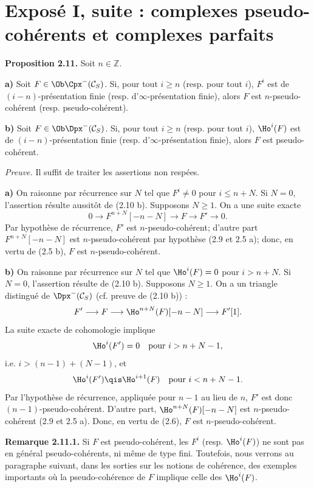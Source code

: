 \documentclass[11pt]{article}
\begin{document}
\section*{Exposé I, suite : complexes pseudo-cohérents et complexes parfaits}

\textbf{Proposition 2.11.} Soit \(n\in\mathbb Z\).

\textbf{a)} Soit \(F\in\Ob\Cpx^-(\mathcal C_S)\). Si, pour tout \(i\geq n\) (resp. pour tout \(i\)), \(F^i\) est de \((i-n)\)-présentation finie (resp. d'\(\infty\)-présentation finie), alors \(F\) est \(n\)-pseudo-cohérent (resp. pseudo-cohérent).

\textbf{b)} Soit \(F\in\Ob\Dpx^-(\mathcal C_S)\). Si, pour tout \(i\geq n\) (resp. pour tout \(i\)), \(\Ho^i(F)\) est de \((i-n)\)-présentation finie (resp. d'\(\infty\)-présentation finie), alors \(F\) est pseudo-cohérent.

\emph{Preuve.} Il suffit de traiter les assertions non respées.

\textbf{a)} On raisonne par récurrence sur \(N\) tel que \(F^i\neq0\) pour \(i\leq n+N\). Si \(N=0\), l'assertion résulte aussitôt de (2.10 b). Supposons \(N\geq1\). On a une suite exacte
\[
  0\longrightarrow F^{n+N}[-n-N]\longrightarrow F\longrightarrow F'\longrightarrow 0 .
\]
Par hypothèse de récurrence, \(F'\) est \(n\)-pseudo-cohérent; d'autre part \(F^{n+N}[-n-N]\) est \(n\)-pseudo-cohérent par hypothèse (2.9 et 2.5 a); donc, en vertu de (2.5 b), \(F\) est \(n\)-pseudo-cohérent.

\textbf{b)} On raisonne par récurrence sur \(N\) tel que \(\Ho^i(F)=0\) pour \(i>n+N\). Si \(N=0\), l'assertion résulte de (2.10 b). Supposons \(N\geq1\). On a un triangle distingué de \(\Dpx^-(\mathcal C_S)\) (cf. preuve de (2.10 b)) :
\[
  F'\longrightarrow F\longrightarrow \Ho^{n+N}(F)[-n-N]\longrightarrow F'[1].
\]
La suite exacte de cohomologie implique
\[
  \Ho^i(F')=0\quad\text{pour }i>n+N-1,
\]
i.e. \(i>(n-1)+(N-1)\), et
\[
  \Ho^i(F')\qis\Ho^{i+1}(F)\quad\text{pour }i<n+N-1 .
\]
Par l'hypothèse de récurrence, appliquée pour \(n-1\) au lieu de \(n\), \(F'\) est donc \((n-1)\)-pseudo-cohérent. D'autre part, \(\Ho^{n+N}(F)[-n-N]\) est \(n\)-pseudo-cohérent (2.9 et 2.5 a). Donc, en vertu de (2.6), \(F\) est \(n\)-pseudo-cohérent.

\textbf{Remarque 2.11.1.} Si \(F\) est pseudo-cohérent, les \(F^i\) (resp. \(\Ho^i(F)\)) ne sont pas en général pseudo-cohérents, ni même de type fini. Toutefois, nous verrons au paragraphe suivant, dans les sorties sur les notions de cohérence, des exemples importants où la pseudo-cohérence de \(F\) implique celle des \(\Ho^i(F)\).
\end{document}
